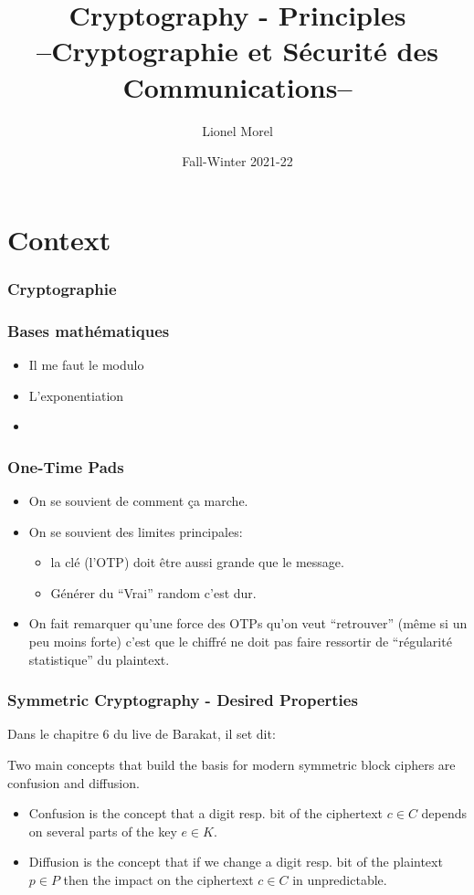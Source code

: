 \documentclass[
hyperref={pdfpagelabels=false}
,xcolor=table
]
{beamer}
\title[CSC - Intro]{Cryptography - Principles \\ --Cryptographie et Sécurité des Communications--}
\author[]{Lionel Morel}
\institute[]{Telecommunications - INSA Lyon}
\date{Fall-Winter 2021-22}
\begin{document}
\begin{frame}
  \maketitle
\end{frame}

\section{Context}

\begin{frame}
  \frametitle{Cryptographie}
\end{frame}


\begin{frame}
  \frametitle{Bases mathématiques}

  \begin{itemize}
  \item Il me faut le modulo
  \item L'exponentiation
  \item 
  \end{itemize}
\end{frame}


\begin{frame}
  \frametitle{One-Time Pads}

  \begin{itemize}
  \item On se souvient de comment ça marche.
  \item On se souvient des limites principales:
    \begin{itemize}
    \item la clé (l'OTP) doit être aussi grande que le message.
    \item Générer du ``Vrai'' random c'est dur. 
    \end{itemize}
  \item On fait remarquer qu'une force des OTPs qu'on veut
    ``retrouver'' (même si un peu moins forte) c'est que le chiffré ne
    doit pas faire ressortir de ``régularité statistique'' du
    plaintext.
  \end{itemize}
  
\end{frame}


\begin{frame}
  \frametitle{Symmetric Cryptography - Desired Properties}

  Dans le chapitre 6 du live de Barakat, il set dit:

  Two main concepts that build the basis for modern symmetric block
  ciphers are confusion and diffusion.
  \begin{itemize}
  \item Confusion is the concept that a digit resp. bit of the
    ciphertext $c \in C$ depends on several parts of the key $e \in K$.
  \item Diffusion is the concept that if we change a digit resp. bit
    of the plaintext $p\in P$ then the impact on the ciphertext $c \in C$ in 
    unpredictable.
  \end{itemize}

  
\end{frame}
\end{document}
